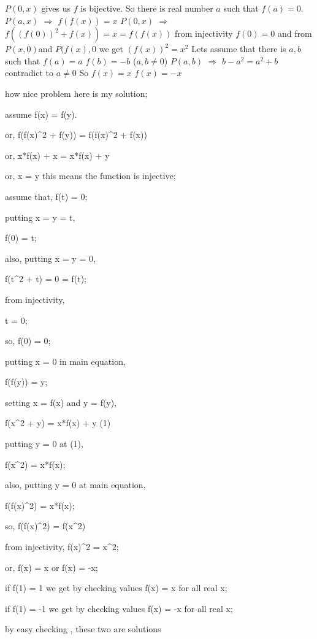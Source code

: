 \begin{solution}
	$P(0,x)$ gives us $f$ is bijective. So there is real number $a$ such that $f(a)=0$.$P(a,x)$ $\Longrightarrow$ $f(f(x))=x$ 
$P(0,x)$ $\Longrightarrow$ $f((f(0))^2+f(x))=x=f(f(x))$ from injectivity $f(0)=0$ and from $P(x,0)$and $P(f(x),0$ we get $(f(x))^2=x^2$ Lets assume that there is $a,b$ such that $f(a)=a$ $f(b)=-b$ ($a,b\neq 0$) $P(a,b)$ $\Longrightarrow$ $b-a^2=a^2+b$ contradict to $a\neq 0$ So $f(x)=x$ $f(x)=-x$
\end{solution}



\begin{solution}
	how nice problem here is my solution;

assume f(x) = f(y).

or, f(f(x)^2 + f(y)) = f(f(x)^2 + f(x))

or, x*f(x) + x = x*f(x) + y

or, x = y this means the function is injective;

assume that, f(t) = 0;

putting x = y = t,

f(0) = t;

also, putting x = y = 0,

f(t^2 + t) = 0 = f(t);

from injectivity,

t = 0;

so, f(0) = 0;

putting x = 0 in main equation,

f(f(y)) = y;

setting x = f(x) and y = f(y),

f(x^2 + y) = x*f(x) + y     (1)

putting y = 0 at (1),

f(x^2) = x*f(x);

also, putting y = 0 at main equation,

f(f(x)^2) = x*f(x);

so, f(f(x)^2) = f(x^2)

from injectivity, f(x)^2 = x^2;

or, f(x) = x or f(x) = -x;

if f(1) = 1 we get by checking values f(x) = x for all real x;

if f(1) = -1 we get by checking values f(x) = -x for all real x;

by easy checking , these two are solutions
\end{solution}



